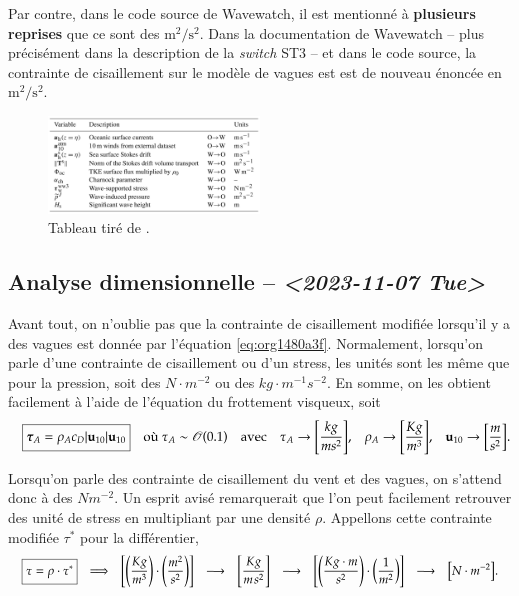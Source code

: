 \documentclass[10pt]{article}
\numberwithin{equation}{section}
\newcommand{\uu}{\vb{u}}
\newcommand{\tall}{\vphantom{A^{x^x}_p}}
\newcommand{\pt}{\hspace{1pt}} %
\begin{document}
Par contre, dans le code source de Wavewatch, il est mentionné à \textbf{plusieurs reprises} que ce sont des \(\mathrm{m}^2/\mathrm{s}^2\).
Dans la documentation de Wavewatch -- plus précisément dans la description de la \emph{switch} ST3 -- et dans le code source, la contrainte de cisaillement sur le modèle de vagues est est de nouveau énoncée en \(\mathrm{m}^2/\mathrm{s}^2\).

\begin{figure}[ht]
\centering
\includegraphics[width=0.5\textwidth]{figures/articles/gmd-13-3067-2020-t01-web.png}
\caption{\label{fig:orga235dca}Tableau tiré de \citet{couvelard2020development}.}
\end{figure}


\subsection{Analyse dimensionnelle -- \textit{<2023-11-07 Tue>}}
\label{sec:orge6361c3}
\label{org072486b}

Avant tout, on n'oublie pas que la contrainte de cisaillement modifiée lorsqu'il y a des vagues est donnée par l'équation \ref{eq:org1480a3f}. 
Normalement, lorsqu'on parle d'une contrainte de cisaillement ou d'un stress, les unités sont les même que pour la pression, soit des \(N\cdot m^{-2}\) ou des \(kg\cdot m^{-1}s^{-2}\).
En somme, on les obtient facilement à l'aide de l'équation du frottement visqueux, soit
\begin{align}
   && \boxed{\boldsymbol{\tau}_{A} = \rho_A c_D \abs{\uu_{10}} \uu_{10}\tall }
   && \text{où}\  \tau_A \sim \mathscr{O}\qty(0.1)
   && \text{avec}
   && \tau_A \rightarrow \qty[\frac{kg}{ms^2}],
   && \rho_A \rightarrow \qty[\frac{Kg}{m^3}],
   && \uu_{10} \rightarrow \qty[\frac{m}{s^2}].
\end{align}

Lorsqu'on parle des contrainte de cisaillement du vent et des vagues, on s'attend donc à des \(N m^{-2}\).
Un esprit avisé remarquerait que l'on peut facilement retrouver des unité de stress en multipliant par une densité \(\rho\).
Appellons cette contrainte modifiée \(\tau^*\) pour la différentier,
\begin{align}
   && \boxed{\tau = \rho \cdot \tau^*\tall}
   &&\Longrightarrow
   &&\qty[\qty(\frac{Kg}{m^3})\cdot \qty(\frac{m^2}{s^2})]
   &&\longrightarrow
   &&\qty[ \frac{Kg}{m\pt s^2} ]
   &&\longrightarrow
   &&\qty[\qty(\frac{Kg\cdot m}{s^2})\cdot \qty(\frac{1}{m^2})]
   &&\longrightarrow
   &&\qty[N \cdot m^{-2}]. &&
\end{align}
\end{document}

